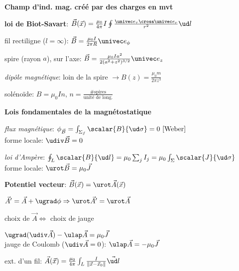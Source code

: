    \item \textbf{Champ d'ind. mag. créé par des charges en mvt}
    \squishlist
     \item \textbf{loi de Biot-Savart}: $\vec B(\vec x) = \frac{\mu_0}{4 \pi} I \oint \frac{\univec e_\tau \cross \univec e_r}{r^2} \ud l$
     \item fil rectiligne ($l = \infty$): $\vec B = \frac{\mu_0 I}{2 \pi R} \univec e_\phi$
     \item spire (rayon $a$), sur l'axe: $\vec B = \frac{\mu_0 I a^2}{2(a^2 + z^2)^{3/2}} \univec e_z$
     \item \emph{dipôle magnétique}: loin de la spire $\rightarrow B(z) = \frac{\mu_0 m}{2 \pi z^3}$ 
     \item solénoïde: $B = \mu_0 I n$, $n = \frac{\textrm{\# spires}}{\textrm{unité de long.}}$
    \squishend

   \item \textbf{Lois fondamentales de la magnétostatique}
    \squishlist
     \item \emph{flux magnétique}: $\phi_{\vec B} = \int_{\Sigma_f} \scalar{B}{\ud \sigma} = 0 \ [\textrm{Weber}]$ \\
           forme locale: $\udiv \vec B = 0$
     \item \emph{loi d'Ampère}: $\oint_L \scalar{B}{\ud l} = \mu_0 \sum_j I_j = \mu_0 \int_\Sigma \scalar{J}{\ud \sigma}$ \\
           forme locale: $\urot \vec B = \mu_0 \vec J$
    \squishend

   \item \textbf{Potentiel vecteur}: $\vec B(\vec x) = \urot \vec A(\vec x)$
    \squishlist
     \item $\vec A' = \vec A + \ugrad \phi \Rightarrow \urot \vec A' = \urot \vec A$
     \item choix de $\vec A \Leftrightarrow$ choix de jauge
     \item $\ugrad (\udiv \vec A) - \ulap \vec A = \mu_0 \vec J$ \\
           jauge de Coulomb ($\udiv \vec A = 0$): $\ulap \vec A = - \mu_0 \vec J$
     \item ext. d'un fil: $\vec A(\vec x) = \frac{\mu_0}{4 \pi} \int_L \frac{I}{\| \vec x - \vec x_0 \|} \vec{\ud l}$
    \squishend


